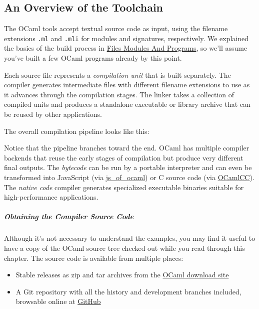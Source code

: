 \hypertarget{an-overview-of-the-toolchain}{%
\subsection{An Overview of the
Toolchain}\label{an-overview-of-the-toolchain}}

The OCaml tools accept textual source code as input, using the filename
extensions \passthrough{\lstinline!.ml!} and
\passthrough{\lstinline!.mli!} for modules and signatures, respectively.
We explained the basics of the build process in
\href{files-modules-and-programs.html\#files-modules-and-programs}{Files
Modules And Programs}, so we'll assume you've built a few OCaml programs
already by this point.

Each source file represents a \emph{compilation unit} that is built
separately. The compiler generates intermediate files with different
filename extensions to use as it advances through the compilation
stages. The linker takes a collection of compiled units and produces a
standalone executable or library archive that can be reused by other
applications.

The overall compilation pipeline looks like this: 

Notice that the pipeline branches toward the end. OCaml has multiple
compiler backends that reuse the early stages of compilation but produce
very different final outputs. The \emph{bytecode} can be run by a
portable interpreter and can even be transformed into JavaScript (via
\href{http://ocsigen.org/js_of_ocaml}{js\_of\_ocaml}) or C source code
(via \href{https://github.com/ocaml-bytes/ocamlcc}{OCamlCC}). The
\emph{native code} compiler generates specialized executable binaries
suitable for high-performance
applications.

\hypertarget{obtaining-the-compiler-source-code}{%
\subparagraph{Obtaining the Compiler Source
Code}\label{obtaining-the-compiler-source-code}}

Although it's not necessary to understand the examples, you may find it
useful to have a copy of the OCaml source tree checked out while you
read through this chapter. The source code is available from multiple
places:

\begin{itemize}
\item
  Stable releases as zip and tar archives from the
  \href{http://ocaml.org/docs/install.html}{OCaml download site}
\item
  A Git repository with all the history and development branches
  included, browsable online at
  \href{https://github.com/ocaml/ocaml}{GitHub}
\end{itemize}

